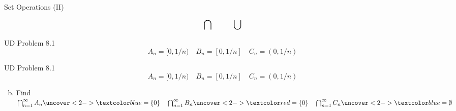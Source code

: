 
\begin{frame}{}
  \begin{center}
    {\Large Set Operations (II)}
  \end{center}

  \[
    \text{\Large $\bigcap \qquad \bigcup$}
  \]
\end{frame}

\begin{frame}{}
  \begin{exampleblock}{UD Problem 8.1}
    \[
      A_n = [0, 1/n) \quad B_n = [0, 1/n] \quad C_n = (0, 1/n)
    \]
  \end{exampleblock}
\end{frame}

\begin{frame}{}
  \begin{exampleblock}{UD Problem 8.1}
    \[
      A_n = [0, 1/n) \quad B_n = [0, 1/n] \quad C_n = (0, 1/n)
    \]

    \begin{enumerate}[(a)]
      \setcounter{enumi}{1}
      \item Find $\bigcap_{n=1}^{\infty} A_n \uncover<2->{\blue{\;= \set{0}}}
	\quad \bigcap_{n=1}^{\infty} B_n \uncover<2->{\red{\;= \set{0}}} 
	\quad \bigcap_{n=1}^{\infty} C_n \uncover<2->{\blue{\;= \emptyset}}$
    \end{enumerate}
  \end{exampleblock}

  \vspace{0.50cm}
  
  \vspace{0.30cm}
\end{frame}

